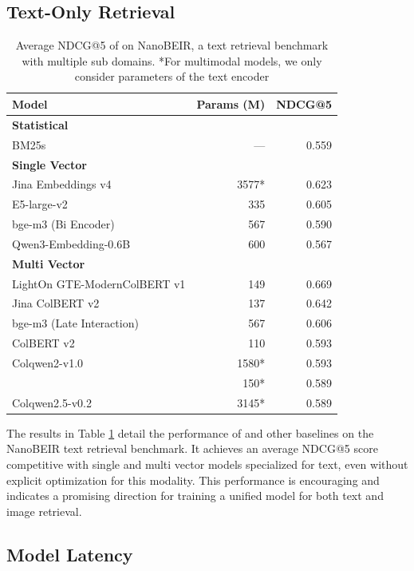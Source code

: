 \subsection{Text-Only Retrieval}
\begin{table}[htbp]
\centering
\begin{tabular}{l r r}
  \toprule
  Model & Params (M) & NDCG@5 \\
  \midrule
  \multicolumn{3}{l}{\textbf{Statistical}} \\
  BM25s & — & 0.559 \\
  \midrule
  \multicolumn{3}{l}{\textbf{Single Vector}} \\
  Jina Embeddings v4 & 3577* & 0.623 \\
  E5-large-v2 & 335 & 0.605 \\
  bge-m3 (Bi Encoder) & 567 & 0.590 \\
  Qwen3-Embedding-0.6B & 600 & 0.567 \\
  \midrule
  \multicolumn{3}{l}{\textbf{Multi Vector}} \\
  LightOn GTE-ModernColBERT v1 & 149 & 0.669 \\
  Jina ColBERT v2 & 137 & 0.642 \\
  bge-m3 (Late Interaction) & 567 & 0.606 \\
  ColBERT v2 & 110 & 0.593 \\
  Colqwen2-v1.0 & 1580* & 0.593\\
  \colflagship{} & 150* & 0.589 \\
  Colqwen2.5-v0.2 & 3145* & 0.589\\
  \bottomrule
\end{tabular}
\caption[NanoBEIR performance]{Average NDCG@5 of \colflagship{} on NanoBEIR, a text retrieval benchmark with multiple sub domains. *For multimodal models, we only consider parameters of the text encoder}
\label{appendix:text_perf}
\end{table}

The results in Table \ref{appendix:text_perf} detail the performance of \colflagship{} and other baselines on the NanoBEIR text retrieval benchmark. It achieves an average NDCG@5 score competitive with single and multi vector models specialized for text, even without explicit optimization for this modality. This performance is encouraging and indicates a promising direction for training a unified model for both text and image retrieval.

\subsection{Model Latency}

